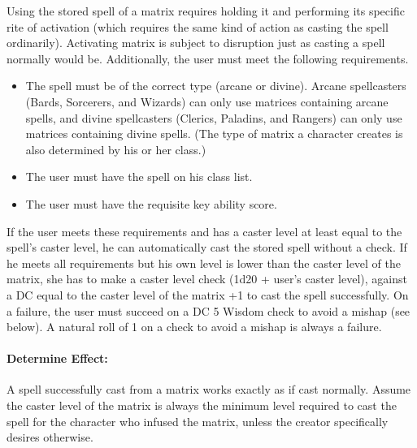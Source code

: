 Using the stored spell of a matrix requires holding it and performing its specific rite of activation (which requires the same kind of action as casting the spell ordinarily).
Activating matrix is subject to disruption just as casting a spell normally would be.
Additionally, the user must meet the following requirements.
\begin{itemize}
 \item The spell must be of the correct type (arcane or divine). Arcane spellcasters (Bards, Sorcerers, and Wizards) can only use matrices containing arcane spells, and divine spellcasters (Clerics, Paladins, and Rangers) can only use matrices containing divine spells. (The type of matrix a character creates is also determined by his or her class.)
 \item The user must have the spell on his class list.
 \item The user must have the requisite key ability score.
\end{itemize}
If the user meets these requirements and has a caster level at least equal to the spell's caster level, he can automatically cast the stored spell without a check. 
If he meets all requirements but his own level is lower than the caster level of the matrix, she has to make a caster level check (1d20 + user's caster level), against a DC equal to the caster level of the matrix +1 to cast the spell successfully. 
On a failure, the user must succeed on a DC 5 Wisdom check to avoid a mishap (see below).
A natural roll of 1 on a check to avoid a mishap is always a failure.
\paragraph{Determine Effect:} A spell successfully cast from a matrix works exactly as if cast normally. 
Assume the caster level of the matrix is always the minimum level required to cast the spell for the character who infused the matrix, unless the creator specifically desires
otherwise.
